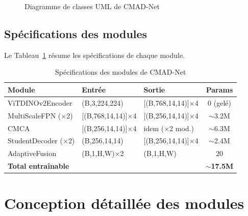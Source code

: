 \documentclass[12pt,a4paper,oneside]{report}
\begin{document}
\begin{figure}[H]
\caption{Diagramme de classes UML de CMAD-Net}
\label{fig:classes_uml}
\end{figure}

\subsection{Spécifications des modules}

Le Tableau~\ref{tab:specs_modules} résume les spécifications de chaque module.

\begin{table}[H]
\centering
\caption{Spécifications des modules de CMAD-Net}
\label{tab:specs_modules}
\begin{tabularx}{\textwidth}{X X X c}
\toprule
\textbf{Module} & \textbf{Entrée} & \textbf{Sortie} & \textbf{Params} \\
\midrule
\rowcolor{tableheader} ViTDINOv2Encoder & (B,3,224,224) & [(B,768,14,14)]$\times$4 & 0 (gelé) \\
MultiScaleFPN ($\times$2) & [(B,768,14,14)]$\times$4 & [(B,256,14,14)]$\times$4 & $\sim$3.2M \\
\rowcolor{tableheader} CMCA & [(B,256,14,14)]$\times$4 & idem ($\times$2 mod.) & $\sim$6.3M \\
StudentDecoder ($\times$2) & (B,256,14,14) & [(B,256,14,14)]$\times$4 & $\sim$2.4M \\
\rowcolor{tableheader} AdaptiveFusion & (B,1,H,W)$\times$2 & (B,1,H,W) & 20 \\
\textbf{Total entraînable} & & & \textbf{$\sim$17.5M} \\
\bottomrule
\end{tabularx}
\end{table}

\section{Conception détaillée des modules}
\end{document}
